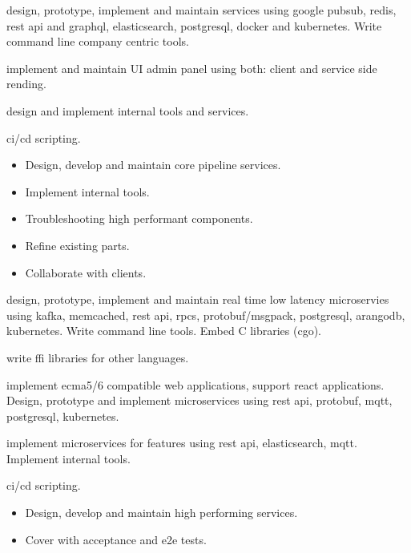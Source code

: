 \documentclass[10pt,a4paper,ragged2e,withhyper]{altacv}
\begin{document}

 design, prototype, implement and maintain services using google
pubsub, redis, rest api and graphql, elasticsearch, postgresql, docker and
kubernetes. Write command line company centric tools.

 implement and maintain UI
admin panel using both: client and service side rending.

 design and implement internal tools and services.

 ci/cd scripting.

\divider

\begin{itemize}
\item Design, develop and maintain core pipeline services.
\item Implement internal tools.
\item Troubleshooting high performant components.
\item Refine existing parts.
\item Collaborate with clients.
\end{itemize}


 design, prototype, implement and maintain real time low latency
microservies using kafka, memcached, rest api, rpcs, protobuf/msgpack,
postgresql, arangodb, kubernetes. Write command line tools. Embed C libraries
(cgo).

 write ffi libraries for other languages.

 implement ecma5/6 compatible web applications, support react
applications. Design, prototype and implement microservices using rest api,
protobuf, mqtt, postgresql, kubernetes.

 implement microservices for features using rest api, elasticsearch,
mqtt. Implement internal tools.

 ci/cd scripting.

\divider

\begin{itemize}
\item Design, develop and maintain high performing services.
\item Cover with acceptance and e2e tests.
\end{itemize}
\end{document}
